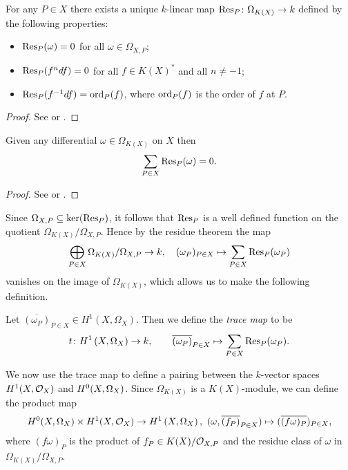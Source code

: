     \begin{thm}\label{theoremresiduemap}
    For any $P\in X$ there exists a unique $k$-linear map $\operatorname{Res}_P \colon \Omega_{K(X)} \rightarrow k$ defined by the following properties:
        \begin{itemize}
            \item $\operatorname{Res}_P(\omega) = 0$ for all $\omega \in \Omega_{X,P}$;
            \item $\operatorname{Res}_P(f^ndf) = 0$ for all $f \in K(X)^*$ and all $n \neq -1$;
            \item $\operatorname{Res}_P(f^{-1}df) = \operatorname{ord}_P(f)$, where $\operatorname{ord}_P(f)$ is the order of $f$ at $P$.
        \end{itemize}
    \end{thm}
    \begin{proof}
    See \cite[Chap.\ II, \S 7 and \S 11]{algebraicgroupsandclassfields} or \cite{residuesofdifferentialsoncurve}.
    \end{proof}


    \begin{thm}\label{theoremresiduetheorem}
    Given any differential $\omega \in \Omega_{K(X)}$ on $X$ then 
        \[
        \sum_{P \in X}\operatorname{Res}_P(\omega) = 0.
        \]  
    \end{thm}
    \begin{proof}
    See \cite[Chap.\ II, Prop.\ 6]{algebraicgroupsandclassfields} or \cite[Pg.\ 155]{residuesofdifferentialsoncurve}.
    \end{proof}

Since $\Omega_{X,P} \subseteq \ker (\operatorname{Res}_P)$, it follows that $\operatorname{Res}_P$ is a well defined function on the quotient $\Omega_{K(X)}/\Omega_{X,P}$.
Hence by the residue theorem the map
    \begin{equation*} 
    \bigoplus_{P \in X} \Omega_{K(X)}/\Omega_{X,P} \rightarrow k, \quad (\omega_P)_{P \in X} \mapsto \sum_{P\in X} \operatorname{Res}_P(\omega_P)
    \end{equation*} 
vanishes on the image of $\Omega_{K(X)}$, which allows us to make the following definition.
    
    \begin{defn}
    Let $\overline{(\omega_P)}_{P \in X} \in H^1(X,\Omega_X)$.
    Then we define the \emph{trace map} to be 
        \[
    t \colon H^1\left(X, \Omega_X\right) \rightarrow k, \qquad \overline{(\omega_P)}_{P \in X}  \mapsto \sum_{P \in X} \operatorname{Res}_P(\omega_P).
        \]
    \end{defn}

We now use the trace map to define a pairing between the $k$-vector spaces $H^1(X,\mathcal{O}_X)$ and ${H^0(X,\Omega_X)}$.
Since $\Omega_{K(X)}$ is a $K(X)$-module, we can define the product map 
    \begin{equation}\label{equationproductmap}
    {H^0(X,\Omega_X)} \times H^1(X,\mathcal{O}_X) \rightarrow H^1\left(X, \Omega_X\right), \ (\omega, \overline{(f_P)}_{P \in X}) \mapsto ( \overline {(f  \omega)_P})_{P \in X},
    \end{equation}
where $(f\omega)_P$ is the product of $f_P \in K(X)/{\cal O}_{X,P}$ and the residue class of $\omega$ in $\Omega_{K(X)}/\Omega_{X,P}$.

